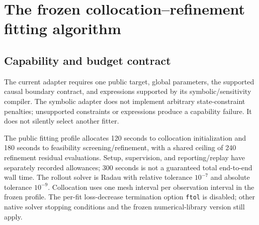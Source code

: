 \documentclass[11pt]{article}
\begin{document}
\section{The frozen collocation--refinement fitting algorithm}
\label{sec:fitting}

\subsection{Capability and budget contract}
The current adapter requires one public target, global parameters, the supported
causal boundary contract, and expressions supported by its symbolic/sensitivity
compiler. The symbolic adapter does not implement arbitrary state-constraint
penalties; unsupported constraints or expressions produce a capability failure.
It does not silently select another fitter.

The public fitting profile allocates 120 seconds to collocation initialization
and 180 seconds to feasibility screening/refinement, with a shared ceiling of
240 refinement residual evaluations. Setup, supervision, and reporting/replay
have separately recorded allowances; 300 seconds is not a guaranteed total
end-to-end wall time. The rollout solver is Radau with relative tolerance
$10^{-7}$ and absolute tolerance $10^{-9}$. Collocation uses one mesh interval
per observation interval in the frozen profile. The per-fit loss-decrease
termination option \texttt{ftol} is disabled; other native solver stopping
conditions and the frozen numerical-library version still apply.
\end{document}
